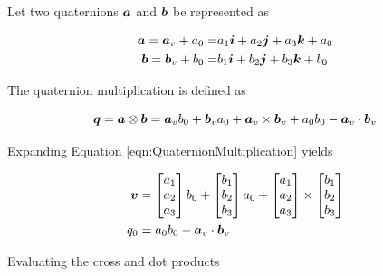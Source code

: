 Let two quaternions $\boldsymbol{a}$ and $\boldsymbol{b}$ be represented as

\begin{subequations}
\begin{align}
  \boldsymbol{a} = \boldsymbol{a}_v + a_0 = & a_1 \boldsymbol{i} + a_2 \boldsymbol{j} + a_3 \boldsymbol{k} + a_0\\
  \boldsymbol{b} = \boldsymbol{b}_v + b_0 = & b_1 \boldsymbol{i} + b_2 \boldsymbol{j} + b_3 \boldsymbol{k} + b_0
\end{align}
\end{subequations}

The quaternion multiplication is defined as

\begin{equation}
  \boldsymbol{q} = \boldsymbol{a} \otimes \boldsymbol{b} = \boldsymbol{a}_v b_0 + \boldsymbol{b}_v a_0 + \boldsymbol{a}_v \times \boldsymbol{b}_v + a_0 b_0 - \boldsymbol{a}_v \cdot \boldsymbol{b}_v
  \label{eqn:QuaternionMultiplication}
\end{equation}

Expanding Equation \ref{eqn:QuaternionMultiplication} yields

\begin{subequations}
\begin{align}
  \boldsymbol{v} & = \begin{bmatrix} a_1 \\ a_2 \\ a_3 \end{bmatrix} b_0 +\begin{bmatrix} b_1 \\ b_2 \\ b_3 \end{bmatrix} a_0 + \begin{bmatrix} a_1 \\ a_2 \\ a_3 \end{bmatrix} \times \begin{bmatrix} b_1 \\ b_2 \\ b_3 \end{bmatrix} \\
  q_0 & = a_0 b_0 - \boldsymbol{a}_v \cdot \boldsymbol{b}_v
\end{align}
\end{subequations}

Evaluating the cross and dot products

